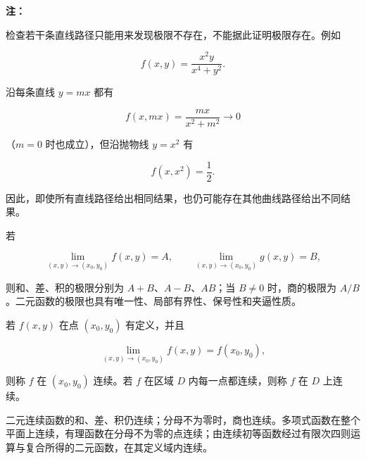 \documentclass[fontset=fandol]{ctexart}
\newenvironment{warning}{\par\noindent\textbf{注：}\quad}{\par\vspace{0.8em}}
\begin{document}
\begin{warning}

	检查若干条直线路径只能用来发现极限不存在，不能据此证明极限存在。例如

	\[

	f(x,y)=\frac{x^2y}{x^4+y^2}.

	\]

	沿每条直线 \(y=mx\) 都有

	\[

	f(x,mx)=\frac{mx}{x^2+m^2}\to0

	\]

	（\(m=0\) 时也成立），但沿抛物线 \(y=x^2\) 有

	\[

	f(x,x^2)=\frac12.

	\]

	因此，即使所有直线路径给出相同结果，也仍可能存在其他曲线路径给出不同结果。

\end{warning}



\begin{theorem}[二元函数极限的基本运算法则]

	若

	\[

	\lim_{(x,y)\to(x_0,y_0)}f(x,y)=A,\qquad

	\lim_{(x,y)\to(x_0,y_0)}g(x,y)=B,

	\]

	则和、差、积的极限分别为 \(A+B\)、\(A-B\)、\(AB\)；当 \(B\neq0\) 时，商的极限为 \(A/B\)。二元函数的极限也具有唯一性、局部有界性、保号性和夹逼性质。

\end{theorem}



\begin{definition}[二元函数的连续性]

	若 \(f(x,y)\) 在点 \((x_0,y_0)\) 有定义，并且

	\[

	\lim_{(x,y)\to(x_0,y_0)}f(x,y)=f(x_0,y_0),

	\]

	则称 \(f\) 在 \((x_0,y_0)\) 连续。若 \(f\) 在区域 \(D\) 内每一点都连续，则称 \(f\) 在 \(D\) 上连续。

\end{definition}



\begin{proposition}[连续函数的运算]

	二元连续函数的和、差、积仍连续；分母不为零时，商也连续。多项式函数在整个平面上连续，有理函数在分母不为零的点连续；由连续初等函数经过有限次四则运算与复合所得的二元函数，在其定义域内连续。

\end{proposition}
\end{document}
